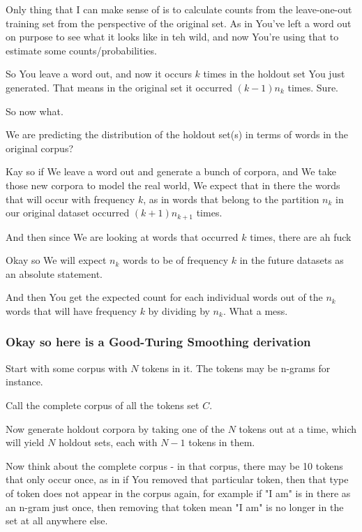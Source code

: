 \documentclass{article}
\begin{document}
			Only thing that I can make sense of is to calculate counts from the leave-one-out training set from the perspective of the original set. As in You've left a word out on purpose to see what it looks like in teh wild, and now You're using that to estimate some counts/probabilities.
			
			So You leave a word out, and now it occurs $k$ times in the holdout set You just generated. That means in the original set it occurred $(k-1)n_k$ times. Sure.
			
			So now what. 
			
			We are predicting the distribution of the holdout set(s) in terms of words in the original corpus?
			
			Kay so if We leave a word out and generate a bunch of corpora, and We take those new corpora to model the real world, We expect that in there the words that will occur with frequency $k$, as in words that belong to the partition $n_k$ in our original dataset occurred $(k+1)n_{k+1}$ times.
			
			And then since We are looking at words that occurred $k$ times, there are ah fuck 
			
			Okay so We will expect $n_k$ words to be of frequency $k$ in the future datasets as an absolute statement.
			
			And then You get the expected count for each individual words out of the $n_k$ words that will have frequency $k$ by dividing by $n_k$. What a mess.
			
		\subsubsection{Okay so here is a Good-Turing Smoothing derivation}
		
			Start with some corpus with $N$ tokens in it. The tokens may be n-grams for instance.
			
			Call the complete corpus of all the tokens set $C$. 
			
			Now generate holdout corpora by taking one of the $N$ tokens out at a time, which will yield $N$ holdout sets, each with $N-1$ tokens in them.
			
			Now think about the complete corpus - in that corpus, there may be 10 tokens that only occur once, as in if You removed that particular token, then that type of token does not appear in the corpus again, for example if "I am" is in there as an n-gram just once, then removing that token mean "I am" is no longer in the set at all anywhere else.
			
\end{document}
